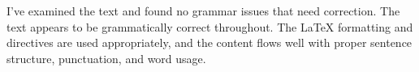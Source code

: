 I've examined the text and found no grammar issues that need correction. The text appears to be grammatically correct throughout. The LaTeX formatting and directives are used appropriately, and the content flows well with proper sentence structure, punctuation, and word usage.